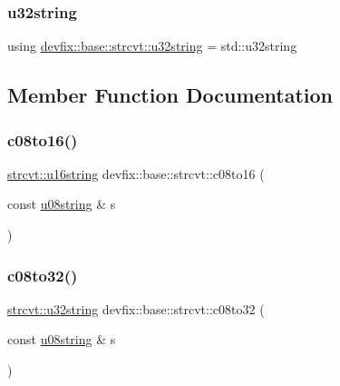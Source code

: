 \mbox{\label{structdevfix_1_1base_1_1strcvt_a34f169167c3c7c1315df2eca9d5532d7}} 
\subsubsection{\texorpdfstring{u32string}{u32string}}
{\footnotesize\ttfamily using \hyperlink{structdevfix_1_1base_1_1strcvt_a34f169167c3c7c1315df2eca9d5532d7}{devfix\+::base\+::strcvt\+::u32string} =  std\+::u32string}



\subsection{Member Function Documentation}
\mbox{\label{structdevfix_1_1base_1_1strcvt_a98341e594aacd83ff26fcfdf985d906f}} 
\subsubsection{\texorpdfstring{c08to16()}{c08to16()}}
{\footnotesize\ttfamily \hyperlink{structdevfix_1_1base_1_1strcvt_a33a324a669607cdb717d84bbfa1f844b}{strcvt\+::u16string} devfix\+::base\+::strcvt\+::c08to16 (\begin{DoxyParamCaption}\item[{const \hyperlink{structdevfix_1_1base_1_1strcvt_ad2a80b923d1d235cee3d4cd0bc560b64}{u08string} \&}]{s }\end{DoxyParamCaption})\hspace{0.3cm}{\ttfamily [static]}}

\mbox{\label{structdevfix_1_1base_1_1strcvt_a71910c157f438d82de7e072988321d66}} 
\subsubsection{\texorpdfstring{c08to32()}{c08to32()}}
{\footnotesize\ttfamily \hyperlink{structdevfix_1_1base_1_1strcvt_a34f169167c3c7c1315df2eca9d5532d7}{strcvt\+::u32string} devfix\+::base\+::strcvt\+::c08to32 (\begin{DoxyParamCaption}\item[{const \hyperlink{structdevfix_1_1base_1_1strcvt_ad2a80b923d1d235cee3d4cd0bc560b64}{u08string} \&}]{s }\end{DoxyParamCaption})\hspace{0.3cm}{\ttfamily [static]}}

